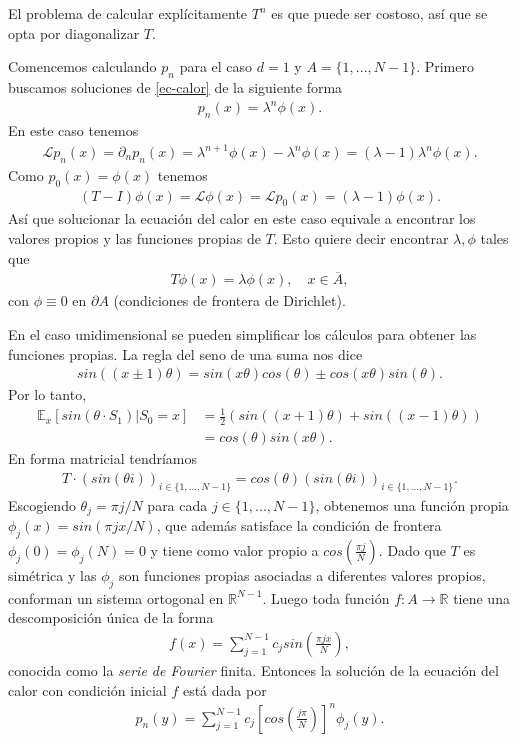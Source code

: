 \documentclass{article}
\numberwithin{equation}{section}
\begin{document}
El problema de calcular explícitamente $T^n$ es que puede ser costoso, así que  se opta por diagonalizar $T$. 

Comencemos calculando $p_n$ para el caso $d=1$ y $A=\{1,...,N-1\}$. Primero buscamos soluciones de \eqref{ec-calor} de la siguiente forma
\begin{align*}
    p_n(x) = \lambda^n\phi(x).
\end{align*}
En este caso tenemos
\begin{align*}
    \mathcal{L}p_n(x) = \partial_np_n(x) = \lambda^{n+1}\phi(x) - \lambda^n\phi(x) = (\lambda-1)\lambda^n\phi(x).
\end{align*}
Como $p_0(x) = \phi(x)$ tenemos
\begin{align*}
   (T-I)\phi(x) = \mathcal{L}\phi(x) = \mathcal{L}p_0(x) = (\lambda - 1)\phi(x).
\end{align*}
Así que solucionar la ecuación del calor en este caso equivale a encontrar los valores propios y las funciones propias de $T$. Esto quiere decir encontrar $\lambda, \phi$ tales que
\begin{align*}
    T\phi(x) = \lambda\phi(x), \quad x \in \overline{A},
\end{align*}
con $\phi \equiv 0$ en $\partial A$ (condiciones de frontera de Dirichlet).

En el caso unidimensional se pueden simplificar los cálculos para obtener las funciones propias. La regla del seno de una suma nos dice
\begin{align*}
    sin((x\pm 1)\theta) = sin(x\theta)cos(\theta) \pm cos(x\theta)sin(\theta).
\end{align*}
Por lo tanto, 
\begin{align*}
    \mathbb{E}_x\left[sin(\theta \cdot S_1) | S_0 = x\right] &= \frac{1}{2}(sin((x+1)\theta) + sin((x-1)\theta))\\
    &= cos(\theta)sin(x\theta).
\end{align*}
En forma matricial tendríamos
\begin{align*}
    T\cdot(sin(\theta i))_{i\in\{1,...,N-1\}} = cos(\theta)(sin(\theta i))_{i\in\{1,...,N-1\}}.
\end{align*}
Escogiendo $\theta_j = \pi j/N$ para cada $j\in \{1,...,N-1\}$, obtenemos una función propia $\phi_j(x) = sin(\pi jx/N)$, que además satisface la condición de frontera $\phi_j(0) = \phi_j(N) = 0$ y tiene como valor propio a $cos(\frac{\pi j}{N})$. Dado que $T$ es simétrica y las $\phi_j$ son funciones propias asociadas a diferentes valores propios, conforman un sistema ortogonal en $\mathbb{R}^{N-1}$. Luego toda función $f : A \to \mathbb{R}$ tiene una descomposición única de la forma
\begin{align}
    f(x) = \sum_{j=1}^{N-1}c_jsin\left(\frac{\pi jx}{N}\right),
\end{align}
conocida como la \emph{serie de Fourier} finita. Entonces la solución de la ecuación del calor con condición inicial $f$ está dada por 
\begin{align*}
    p_n(y) = \sum_{j=1}^{N-1}c_j\left[cos\left(\frac{j\pi}{N}\right)\right]^n\phi_j(y).
\end{align*}
\end{document}
